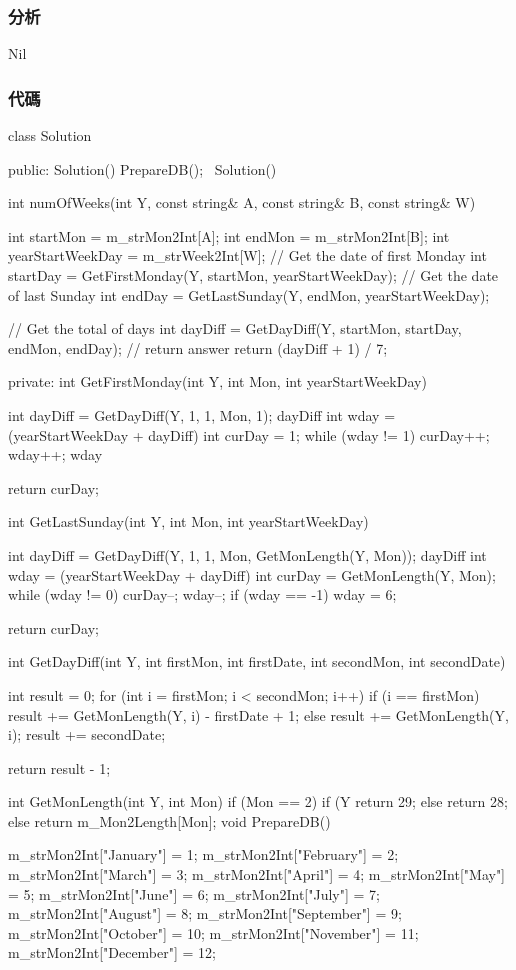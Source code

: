 \subsubsection{分析}
Nil


\subsubsection{代碼}
\begin{Code}
class Solution
{
public:
    Solution() { PrepareDB(); }
    ~Solution() {}

    int numOfWeeks(int Y, const string& A, const string& B, const string& W)
    {
        int startMon = m_strMon2Int[A];
        int endMon = m_strMon2Int[B];
        int yearStartWeekDay = m_strWeek2Int[W];
        // Get the date of first Monday
        int startDay = GetFirstMonday(Y, startMon, yearStartWeekDay);
        // Get the date of last Sunday
        int endDay = GetLastSunday(Y, endMon, yearStartWeekDay);

        // Get the total of days
        int dayDiff = GetDayDiff(Y, startMon, startDay, endMon, endDay);
        // return answer
        return (dayDiff + 1) / 7;
    }
private:
    int GetFirstMonday(int Y, int Mon, int yearStartWeekDay)
    {
        int dayDiff = GetDayDiff(Y, 1, 1, Mon, 1);
        dayDiff %
        int wday = (yearStartWeekDay + dayDiff) %
        int curDay = 1;
        while (wday != 1)
        {
            curDay++;
            wday++;
            wday %
        }

        return curDay;
    }
    int GetLastSunday(int Y, int Mon, int yearStartWeekDay)
    {
        int dayDiff = GetDayDiff(Y, 1, 1, Mon, GetMonLength(Y, Mon));
        dayDiff %
        int wday = (yearStartWeekDay + dayDiff) %
        int curDay = GetMonLength(Y, Mon);
        while (wday != 0)
        {
            curDay--;
            wday--;
            if (wday == -1) wday = 6;
        }

        return curDay;
    }
    int GetDayDiff(int Y, int firstMon, int firstDate, int secondMon, int secondDate)
    {
        int result = 0;
        for (int i = firstMon; i < secondMon; i++)
        {
            if (i == firstMon)
                result += GetMonLength(Y, i) - firstDate + 1;
            else
                result += GetMonLength(Y, i);
        }
        result += secondDate;

        return result - 1;
    }
    int GetMonLength(int Y, int Mon)
    {
        if (Mon == 2)
        {
            if (Y %
                return 29;
            else
                return 28;
        }
        else
            return m_Mon2Length[Mon];
    }
    void PrepareDB()
    {
        m_strMon2Int["January"] = 1;
        m_strMon2Int["February"] = 2;
        m_strMon2Int["March"] = 3;
        m_strMon2Int["April"] = 4;
        m_strMon2Int["May"] = 5;
        m_strMon2Int["June"] = 6;
        m_strMon2Int["July"] = 7;
        m_strMon2Int["August"] = 8;
        m_strMon2Int["September"] = 9;
        m_strMon2Int["October"] = 10;
        m_strMon2Int["November"] = 11;
        m_strMon2Int["December"] = 12;

}}
\end{Code}
